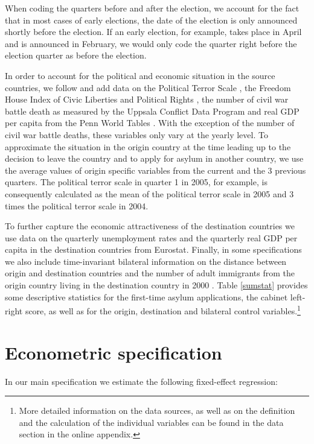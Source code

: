 \documentclass[a4paper,12pt]{article}
\begin{document}
 

When coding the quarters before and after the election, we account for the fact that in most cases of early elections, the date of the election is only announced shortly before the election. If an early election, for example, takes place in April and is announced in February, we would only code the quarter right before the election quarter as before the election. 

In order to account for the political and economic situation in the source countries, we follow \cite{hatton2016} and add data on the Political Terror Scale \citep{PTS2016}, the Freedom House Index of Civic Liberties and Political Rights \citep{FHI2017}, the number of civil war battle death as measured by the Uppsala Conflict Data Program \citep{Uppsala2017} and real GDP per capita from the Penn World Tables \citep{PWT2015}.  With the exception of the number of civil war battle deaths, these variables only vary at the yearly level. To approximate the situation in the origin country at the time leading up to the decision to leave the country and to apply for asylum in another country, we use the average values of origin specific variables from the current and the 3 previous quarters. The political terror scale in quarter 1 in 2005, for example, is consequently calculated as the mean of the political terror scale in 2005 and 3 times the political terror scale in 2004. 

To further capture the economic attractiveness of the destination countries we use data on the quarterly unemployment rates and the quarterly real GDP per capita in the destination countries from Eurostat. Finally, in some specifications we also include time-invariant bilateral information on the distance between origin and destination countries \citep{distance2017} and the number of adult immigrants from the origin country living in the destination country in 2000 \citep{Artucc2015}. Table \ref{sumstat} provides some descriptive statistics for the first-time asylum applications, the cabinet left-right score, as well as for the origin, destination and bilateral control variables.\footnote{More detailed information on the data sources, as well as on the definition and the calculation of the individual variables can be found in the data section in the online appendix.}





\section{Econometric specification} \label{sec:econometric}
In our main specification we estimate the following fixed-effect regression:
\end{document}
